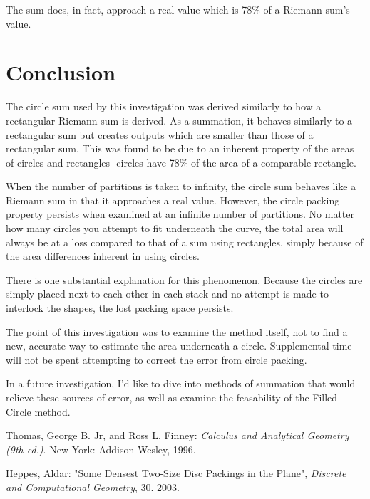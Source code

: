 \documentclass[12pt]{article}
\begin{document}
      The sum does, in fact, approach a real value which is 78\% of a Riemann sum's value.

  \section{Conclusion}
    The circle sum used by this investigation was derived similarly to how a rectangular Riemann sum is derived. As a summation, it behaves similarly to a rectangular sum but creates outputs which are smaller than those of a rectangular sum. This was found to be due to an inherent property of the areas of circles and rectangles- circles have 78\% of the area of a comparable rectangle.

    When the number of partitions is taken to infinity, the circle sum behaves like a Riemann sum in that it approaches a real value. However, the circle packing property persists when examined at an infinite number of partitions. No matter how many circles you attempt to fit underneath the curve, the total area will always be at a loss compared to that of a sum using rectangles, simply because of the area differences inherent in using circles.

    There is one substantial explanation for this phenomenon. Because the circles are simply placed next to each other in each stack and no attempt is made to interlock the shapes, the lost packing space persists.

    The point of this investigation was to examine the method itself, not to find a new, accurate way to estimate the area underneath a circle. Supplemental time will not be spent attempting to correct the error from circle packing.

    In a future investigation, I'd like to dive into methods of summation that would relieve these sources of error, as well as examine the feasability of the Filled Circle method.

  \begin{thebibliography}{9}

      Thomas, George B. Jr, and Ross L. Finney: \emph{Calculus and Analytical Geometry (9th ed.)}. New York: Addison Wesley, 1996.

      Heppes, Aldar: "Some Densest Two-Size Disc Packings in the Plane", \emph{Discrete and Computational Geometry}, 30. 2003.

  \end{thebibliography}
\end{document}
